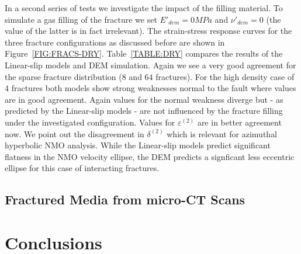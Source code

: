 \documentclass[review,authoryear]{elsarticle}
\begin{document}
In a second series of tests we investigate the impact of the filling material. To simulate a gas filling of the fracture we set $E'_{dem} = 0 MPa$ and $\nu'_{dem} = 0$ 
(the value of the latter is in fact irrelevant). The strain-stress response curves for the three fracture configurations as discussed before 
are shown in Figure~\ref{FIG:FRACS-DRY}. Table~\ref{TABLE:DRY} compares the results of the Linear-slip models and DEM simulation. 
Again we see a very good agreement for the sparse fracture distribution ($8$ and $64$ fractures). 
For the high density case of $4$ fractures both models show strong weaknesses normal to the fault where values are in good agreement. 
Again values for the normal weakness diverge but - as predicted by the Linear-slip models - are not influenced by the fracture filling under the 
investigated configuration. Values for $\varepsilon^{(2)}$ are in better agreement now. We point out the disagreement in $\delta^{(2)}$  which
is relevant for azimuthal hyperbolic NMO analysis. While the Linear-slip models predict significant flatness in the NMO velocity ellipse, the DEM predicts a signficant less eccentric ellipse for this case of interacting fractures. 

\subsection{Fractured Media from micro-CT Scans}\label{SEC:FRAC}

\section{Conclusions}\label{SEC:CONCL}

\end{document}
